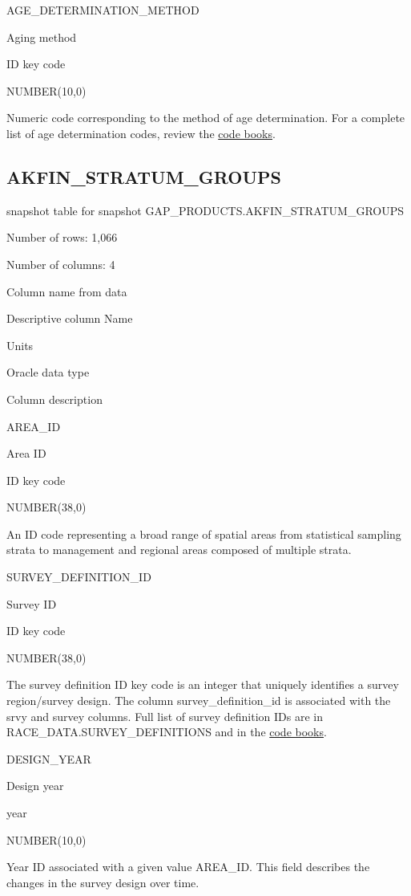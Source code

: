 \documentclass[
  letterpaper,
  oneside,
  open=any]{scrbook}
\begin{document}
AGE\_DETERMINATION\_METHOD

Aging method

ID key code

NUMBER(10,0)

Numeric code corresponding to the method of age determination. For a
complete list of age determination codes, review the
\href{https://www.fisheries.noaa.gov/resource/document/groundfish-survey-species-code-manual-and-data-codes-manual}{code
books}.

\subsection{AKFIN\_STRATUM\_GROUPS}\label{akfin_stratum_groups}

snapshot table for snapshot GAP\_PRODUCTS.AKFIN\_STRATUM\_GROUPS

Number of rows: 1,066

Number of columns: 4

Column name from data

Descriptive column Name

Units

Oracle data type

Column description

AREA\_ID

Area ID

ID key code

NUMBER(38,0)

An ID code representing a broad range of spatial areas from statistical
sampling strata to management and regional areas composed of multiple
strata.

SURVEY\_DEFINITION\_ID

Survey ID

ID key code

NUMBER(38,0)

The survey definition ID key code is an integer that uniquely identifies
a survey region/survey design. The column survey\_definition\_id is
associated with the srvy and survey columns. Full list of survey
definition IDs are in RACE\_DATA.SURVEY\_DEFINITIONS and in the
\href{https://www.fisheries.noaa.gov/resource/document/groundfish-survey-species-code-manual-and-data-codes-manual}{code
books}.

DESIGN\_YEAR

Design year

year

NUMBER(10,0)

Year ID associated with a given value AREA\_ID. This field describes the
changes in the survey design over time.
\end{document}

